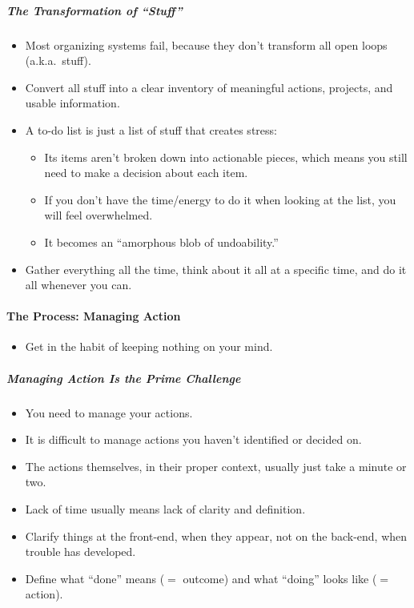 \documentclass{article}
\begin{document}
\subparagraph{The Transformation of ``Stuff''}

\begin{itemize}
  \item Most organizing systems fail, because they don't transform all open loops (a.k.a.\ stuff).
  \item Convert all stuff into a clear inventory of meaningful actions, projects, and usable information.
  \item A to-do list is just a list of stuff that creates stress:
  \begin{itemize}
    \item Its items aren't broken down into actionable pieces, which means you still need to make a decision about each item.
    \item If you don't have the time/energy to do it when looking at the list, you will feel overwhelmed.
    \item It becomes an ``amorphous blob of undoability.''
  \end{itemize}
  \item Gather everything all the time, think about it all at a specific time, and do it all whenever you can.
\end{itemize}

\paragraph{The Process: Managing Action}

\begin{itemize}
  \item Get in the habit of keeping nothing on your mind.
\end{itemize}

\subparagraph{Managing Action Is the Prime Challenge}

\begin{itemize}
  \item You need to manage your actions.
  \item It is difficult to manage actions you haven't identified or decided on.
  \item The actions themselves, in their proper context, usually just take a minute or two.
  \item Lack of time usually means lack of clarity and definition.
  \item Clarify things at the front-end, when they appear, not on the back-end, when trouble has developed.
  \item Define what ``done'' means ($=$ outcome) and what ``doing'' looks like ($=$ action).
\end{itemize}
\end{document}
